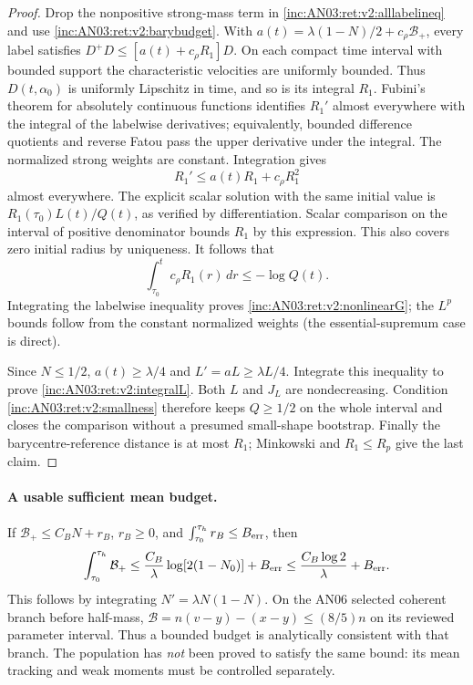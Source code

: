 \documentclass[11pt]{article}
\numberwithin{equation}{section}
\theoremstyle{remark}\newtheorem{remark}[theorem]{Remark}
\newcommand{\dd}{\,d}
\newcommand{\1}{\mathbf 1}
\begin{document}
\begin{proof}
Drop the nonpositive strong-mass term in
\eqref{inc:AN03:ret:v2:alllabelineq} and use
\eqref{inc:AN03:ret:v2:barybudget}. With
$a(t)=\lambda(1-N)/2+c_\rho\mathcal B_+$, every label satisfies
$D^+D\le[a(t)+c_\rho R_1]D$.
On each compact time interval with bounded support the characteristic
velocities are uniformly bounded. Thus $D(t,\alpha_0)$ is uniformly
Lipschitz in time, and so is its integral $R_1$. Fubini's theorem for
absolutely continuous functions identifies $R_1'$ almost everywhere
with the integral of the labelwise derivatives; equivalently, bounded
difference quotients and reverse Fatou pass the upper derivative under
the integral. The normalized strong weights are constant. Integration gives
\[
 R_1'\le a(t)R_1+c_\rho R_1^2
\]
almost everywhere. The explicit scalar solution with the same initial
value is $R_1(\tau_0)L(t)/Q(t)$, as verified by differentiation.
Scalar comparison on the interval of positive denominator bounds $R_1$
by this expression. This also covers zero initial radius by uniqueness.
It follows that
\[
 \int_{\tau_0}^t c_\rho R_1(r)\dd r
 \le-\log Q(t).
\]
Integrating the labelwise inequality proves
\eqref{inc:AN03:ret:v2:nonlinearG}; the $L^p$ bounds follow from the
constant normalized weights (the essential-supremum case is direct).

Since $N\le1/2$, $a(t)\ge\lambda/4$ and $L'=aL\ge\lambda L/4$.
Integrate this inequality to prove \eqref{inc:AN03:ret:v2:integralL}.
Both $L$ and $J_L$ are nondecreasing. Condition
\eqref{inc:AN03:ret:v2:smallness} therefore keeps $Q\ge1/2$ on the
whole interval and closes the comparison without a presumed small-shape
bootstrap. Finally the barycentre-reference distance is at most $R_1$;
Minkowski and $R_1\le R_p$ give the last claim.
\end{proof}

\paragraph{A usable sufficient mean budget.}
If
$\mathcal B_+\le C_B N+r_B$, $r_B\ge0$, and
$\int_{\tau_0}^{\tau_h}r_B\le B_{\rm err}$, then
\begin{equation}\label{inc:AN03:ret:v2:meanbudget}
 \int_{\tau_0}^{\tau_h}\mathcal B_+
 \le\frac{C_B}{\lambda}\log[2(1-N_0)]+B_{\rm err}
 \le\frac{C_B\log2}{\lambda}+B_{\rm err}.
\end{equation}
This follows by integrating $N'=\lambda N(1-N)$.
On the AN06 selected coherent branch before half-mass,
$\mathcal B=n(v-y)-(x-y)\le(8/5)n$ on its reviewed parameter interval.
Thus a bounded budget is analytically consistent with that branch.
The population has \emph{not} been proved to satisfy the same bound:
its mean tracking and weak moments must be controlled separately.
\end{document}
